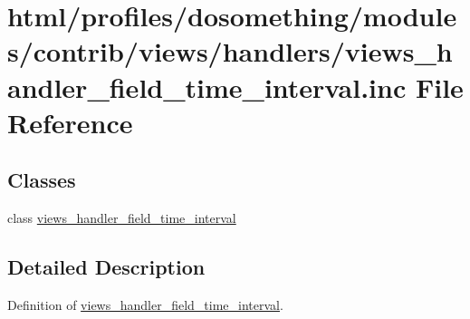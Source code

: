\hypertarget{views__handler__field__time__interval_8inc}{
\section{html/profiles/dosomething/modules/contrib/views/handlers/views\_\-handler\_\-field\_\-time\_\-interval.inc File Reference}
\label{views__handler__field__time__interval_8inc}
}
\subsection*{Classes}
\begin{DoxyCompactItemize}
\item 
class \hyperlink{classviews__handler__field__time__interval}{views\_\-handler\_\-field\_\-time\_\-interval}
\end{DoxyCompactItemize}


\subsection{Detailed Description}
Definition of \hyperlink{classviews__handler__field__time__interval}{views\_\-handler\_\-field\_\-time\_\-interval}. 